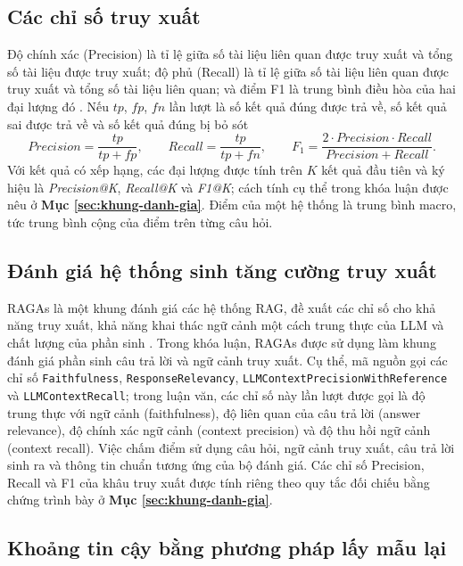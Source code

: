\subsection{Các chỉ số truy xuất}

Độ chính xác (Precision) là tỉ lệ giữa số tài liệu liên quan được truy xuất và tổng số tài liệu được truy xuất; độ phủ (Recall) là tỉ lệ giữa số tài liệu liên quan được truy xuất và tổng số tài liệu liên quan; và điểm F1 là trung bình điều hòa của hai đại lượng đó \cite{manning2008ir}. Nếu $tp$, $fp$, $fn$ lần lượt là số kết quả đúng được trả về, số kết quả sai được trả về và số kết quả đúng bị bỏ sót
\begin{equation}\label{eq:prf}
    \mathit{Precision} = \frac{tp}{tp+fp}, \qquad \mathit{Recall} = \frac{tp}{tp+fn}, \qquad F_1 = \frac{2\cdot \mathit{Precision}\cdot \mathit{Recall}}{\mathit{Precision}+\mathit{Recall}}.
\end{equation}
Với kết quả có xếp hạng, các đại lượng được tính trên $K$ kết quả đầu tiên và ký hiệu là \textit{Precision@K}, \textit{Recall@K} và \textit{F1@K}; cách tính cụ thể trong khóa luận được nêu ở \textbf{Mục \ref{sec:khung-danh-gia}}. Điểm của một hệ thống là trung bình macro, tức trung bình cộng của điểm trên từng câu hỏi.

\subsection{Đánh giá hệ thống sinh tăng cường truy xuất}

RAGAs là một khung đánh giá các hệ thống RAG, đề xuất các chỉ số cho khả năng truy xuất, khả năng khai thác ngữ cảnh một cách trung thực của LLM và chất lượng của phần sinh \cite{es2024ragas}. Trong khóa luận, RAGAs được sử dụng làm khung đánh giá phần sinh câu trả lời và ngữ cảnh truy xuất. Cụ thể, mã nguồn gọi các chỉ số \texttt{Faithfulness}, \texttt{ResponseRelevancy}, \texttt{LLMContextPrecisionWithReference} và \texttt{LLMContextRecall}; trong luận văn, các chỉ số này lần lượt được gọi là độ trung thực với ngữ cảnh (faithfulness), độ liên quan của câu trả lời (answer relevance), độ chính xác ngữ cảnh (context precision) và độ thu hồi ngữ cảnh (context recall). Việc chấm điểm sử dụng câu hỏi, ngữ cảnh truy xuất, câu trả lời sinh ra và thông tin chuẩn tương ứng của bộ đánh giá. Các chỉ số Precision, Recall và F1 của khâu truy xuất được tính riêng theo quy tắc đối chiếu bằng chứng trình bày ở \textbf{Mục \ref{sec:khung-danh-gia}}.

\subsection{Khoảng tin cậy bằng phương pháp lấy mẫu lại}


